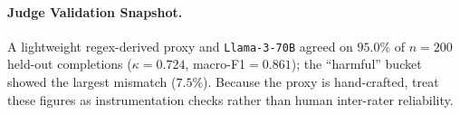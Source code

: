 \paragraph{Judge Validation Snapshot.} A lightweight regex-derived proxy and \texttt{Llama-3-70B} agreed on $95.0\%$ of $n{=}200$ held-out completions ($\kappa{=}0.724$, macro-F1${=}0.861$); the ``harmful'' bucket showed the largest mismatch ($7.5\%$). Because the proxy is hand-crafted, treat these figures as instrumentation checks rather than human inter-rater reliability.
